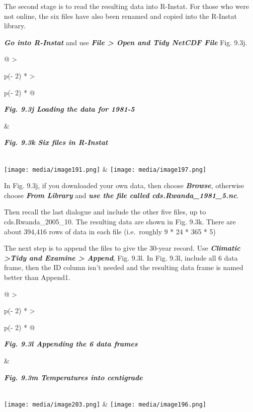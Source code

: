 \documentclass[
  letterpaper,
  DIV=11,
  numbers=noendperiod]{scrreprt}
\begin{document}
The second stage is to read the resulting data into R-Instat. For those
who were not online, the six files have also been renamed and copied
into the R-Instat library.

\textbf{\emph{Go into R-Instat}} and use \textbf{\emph{File
\textgreater{} Open and Tidy NetCDF File}} Fig. 9.3j.

\begin{longtable}[]{@{}
  >{\raggedright\arraybackslash}p{(\columnwidth - 2\tabcolsep) * }
  >{\raggedright\arraybackslash}p{(\columnwidth - 2\tabcolsep) * }@{}}
\toprule\noalign{}
\begin{minipage}[b]{\linewidth}\raggedright
\textbf{\emph{Fig. 9.3j Loading the data for 1981-5}}
\end{minipage} & \begin{minipage}[b]{\linewidth}\raggedright
\textbf{\emph{Fig. 9.3k Six files in R-Instat}}
\end{minipage} \\
\midrule\noalign{}
\endhead
\bottomrule\noalign{}
\endlastfoot
\texttt{[image: media/image191.png]} &
\texttt{[image: media/image197.png]} \\
\end{longtable}

In Fig. 9.3j, if you downloaded your own data, then choose
\textbf{\emph{Browse}}, otherwise choose \textbf{\emph{From Library}}
and \textbf{\emph{use the file called cds.Rwanda\_1981\_5.nc}}.

Then recall the last dialogue and include the other five files, up to
cds.Rwanda\_2005\_10. The resulting data are shown in Fig. 9.3k. There
are about 394,416 rows of data in each file (i.e.~roughly 9 * 24 * 365 *
5)

The next step is to append the files to give the 30-year record. Use
\textbf{\emph{Climatic \textgreater Tidy and Examine \textgreater{}
Append}}, Fig. 9.3l. In Fig. 9.3l, include all 6 data frame, then the ID
column isn't needed and the resulting data frame is named better than
Append1.

\begin{longtable}[]{@{}
  >{\raggedright\arraybackslash}p{(\columnwidth - 2\tabcolsep) * }
  >{\raggedright\arraybackslash}p{(\columnwidth - 2\tabcolsep) * }@{}}
\toprule\noalign{}
\begin{minipage}[b]{\linewidth}\raggedright
\textbf{\emph{Fig. 9.3l Appending the 6 data frames}}
\end{minipage} & \begin{minipage}[b]{\linewidth}\raggedright
\textbf{\emph{Fig. 9.3m Temperatures into centigrade}}
\end{minipage} \\
\midrule\noalign{}
\endhead
\bottomrule\noalign{}
\endlastfoot
\texttt{[image: media/image203.png]} &
\texttt{[image: media/image196.png]} \\
\end{longtable}
\end{document}
